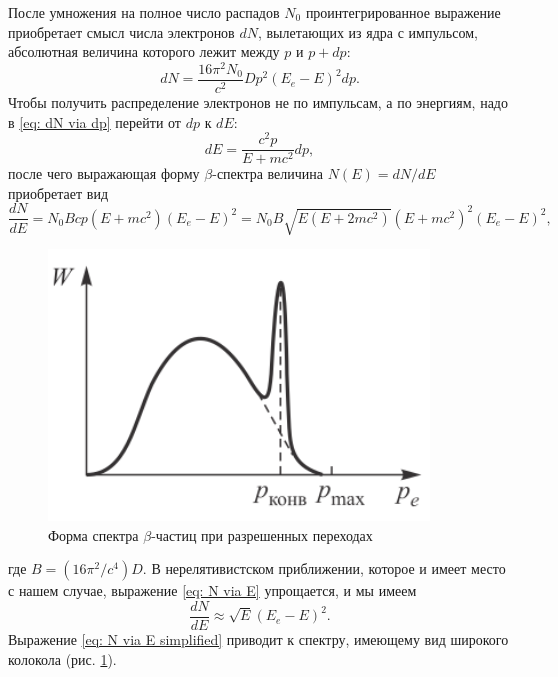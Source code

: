 \documentclass[a4paper,12pt]{article}
\begin{document}
После умножения на полное число распадов $N_0$ проинтегрированное выражение приобретает смысл числа электронов
$dN$, вылетающих из ядра с импульсом, абсолютная величина которого лежит между $p$ и $p + dp$:
\begin{equation}\label{eq: dN via dp}
    dN = \frac{16\pi^2 N_0}{c^2}Dp^2(E_e - E)^2 dp.
\end{equation}
Чтобы получить распределение электронов не по импульсам, а по энергиям, надо в \eqref{eq: dN via dp} перейти от $dp$ к $dE$:
\begin{equation}\label{eq: dE via dp}
    dE = \frac{c^2p}{E + mc^2}dp,
\end{equation}
после чего выражающая форму $\beta$-спектра величина $N(E) = dN/dE$ приобретает вид
\begin{equation}\label{eq: N via E}
    \frac{dN}{dE} = N_0 Bcp(E + mc^2)(E_e - E)^2 = N_0 B\sqrt{E(E + 2mc^2)}(E + mc^2)^2(E_e - E)^2,
\end{equation}
\begin{figure}\label{fig: Beta-decay spectrum}
    \begin{center}
    \vspace{-20pt}
        \includegraphics[width = 0.9\textwidth]{Beta-decay spectrum.png}
    \end{center}
    \caption{Форма спектра $\beta$-частиц при разрешенных переходах}
\end{figure}
где $B = (16\pi^2 / c^4 )D$. В нерелятивистском приближении, которое и имеет место с нашем случае, выражение \eqref{eq: N via E} упрощается, и мы имеем
\begin{equation}\label{eq: N via E simplified}
    \frac{dN}{dE} \approx \sqrt{E}(E_e - E)^2.
\end{equation}
Выражение \eqref{eq: N via E simplified} приводит к спектру, имеющему вид широкого колокола (рис. \hyperref[fig: Beta-decay spectrum]{1}).
\end{document}
